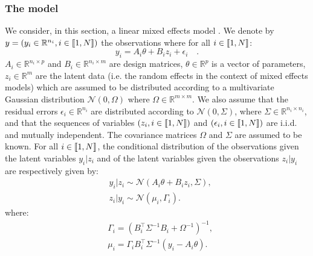 \documentclass[11pt]{article}
\theoremstyle{plain}
\begin{document}
\subsubsection{The model}
We consider, in this section, a linear mixed effects model \citep{lavielle2014Mixed}.
We denote by $y = (y_i \in \mathbb{R}^{n_i}, i \in \llbracket1,N\rrbracket)$ the observations where for all $i \in \llbracket1,N\rrbracket$:
\begin{equation}
y_i = A_i\theta + B_iz_i + \epsilon_i \quad.
\end{equation}
$A_i \in \mathbb{R}^{n_i \times p}$ and $B_i \in \mathbb{R}^{n_i \times m}$ are design matrices, $\theta \in \mathbb{R}^{p}$ is a vector of parameters, $z_i \in \mathbb{R}^{m}$ are the latent data (i.e. the random effects in the context of mixed effects models) which are assumed to be distributed according to a multivariate Gaussian distribution $\mathcal{N}(0,\Omega)$ where $\Omega \in \mathbb{R}^{m \times m}$. We also assume that the residual errors $\epsilon_i \in \mathbb{R}^{n_i}$ are distributed according to $\mathcal{N}(0,\Sigma)$, where $\Sigma \in \mathbb{R}^{n_i \times n_i}$, and that the sequences of variables $(z_i, i \in \llbracket1,N\rrbracket)$ and $(\epsilon_i, i \in \llbracket1,N\rrbracket)$ are i.i.d. and mutually independent. The covariance matrices $\Omega$ and $\Sigma$ are assumed to be known. For all $i \in \llbracket1,N\rrbracket$, the conditional distribution of the observations given the latent variables $y_i|z_i$ and of the latent variables given the observations $z_i|y_i$ are respectively given by:
\begin{align}
& y_i|z_i \sim \mathcal{N}(A_i\theta + B_iz_i,\Sigma),\\
& z_i|y_i \sim \mathcal{N}(\mu_i, \Gamma_i).
\end{align}
where:
\begin{align}\label{posteriormean}
&\Gamma_i =  (B_i^\top \Sigma^{-1} B_i + \Omega^{-1})^{-1},\\
&\mu_i = \Gamma_i B_i^\top\Sigma^{-1} (y_i - A_i\theta).
\end{align}
\end{document}
